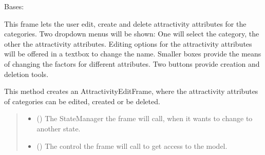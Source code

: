 \documentclass[letterpaper,10pt,english]{sphinxmanual}
\begin{document}
\begin{fulllineitems}
\label{\detokenize{apidoc/src.osm_configurator.view.toplevelframes:src.osm_configurator.view.toplevelframes.attractivity_edit_frame.AttractivityEditFrame}}
\pysigstartsignatures
{}
\pysigstopsignatures
\sphinxAtStartPar
Bases: {\hyperref[\detokenize{apidoc/src.osm_configurator.view.toplevelframes:src.osm_configurator.view.toplevelframes.top_level_frame.TopLevelFrame}]{}}

\sphinxAtStartPar
This frame lets the user edit, create and delete attractivity attributes for the categories.
Two drop\sphinxhyphen{}down menus will be shown: One will select the category, the other the attractivity attributes.
Editing options for the attractivity attributes will be offered in a textbox to change the name. Smaller boxes
provide the means of changing the factors for different attributes.
Two buttons provide creation and deletion tools.

\begin{fulllineitems}
\label{\detokenize{apidoc/src.osm_configurator.view.toplevelframes:src.osm_configurator.view.toplevelframes.attractivity_edit_frame.AttractivityEditFrame.__init__}}
\pysigstartsignatures
{}
\pysigstopsignatures
\sphinxAtStartPar
This method creates an AttractivityEditFrame, where the attractivity attributes of categories can be edited,
created or be deleted.
\begin{quote}\begin{description}
\begin{itemize}
\item {} 
\sphinxAtStartPar
{} ({\hyperref[\detokenize{apidoc/src.osm_configurator.view.states:src.osm_configurator.view.states.state_manager.StateManager}]{}}) \textendash{} The StateManager the frame will call, when it wants to change to another state.

\item {} 
\sphinxAtStartPar
{} ({\hyperref[\detokenize{apidoc/src.osm_configurator.control:src.osm_configurator.control.control_interface.IControl}]{}}) \textendash{} The control the frame will call to get access to the model.


\end{itemize}
\end{description}
\end{quote}
\end{fulllineitems}
\end{fulllineitems}
\end{document}
